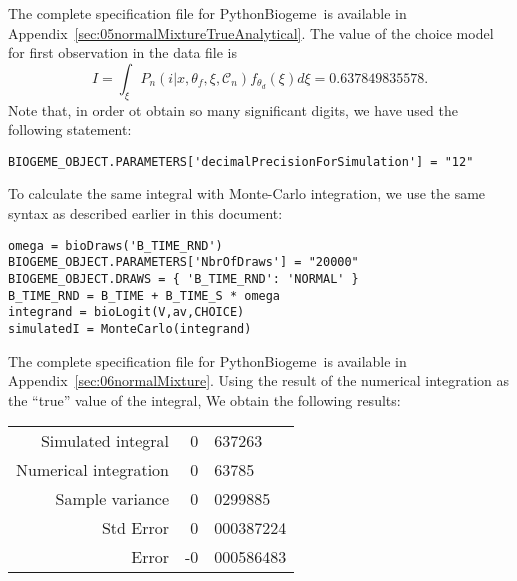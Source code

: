 \documentclass[12pt,a4paper]{article}
\newcommand{\C}{\mathcal{C}}
\newcommand{\PBIOGEME}{PythonBiogeme}
\begin{document}
The complete specification file for \PBIOGEME\ is available in
Appendix~\ref{sec:05normalMixtureTrueAnalytical}. The value of the
choice model for first observation in the data file is 
\begin{equation}
I =  \int_\xi P_n(i|x,\theta_f,\xi,\C_n) f_{\theta_d}(\xi)d\xi = 0.637849835578.
\end{equation}
Note that, in order ot obtain so many significant digits, we have used
the following statement:
\begin{lstlisting}
BIOGEME_OBJECT.PARAMETERS['decimalPrecisionForSimulation'] = "12"
\end{lstlisting}
To calculate the same integral with Monte-Carlo integration, we use
the same syntax as described earlier in this document:
\begin{lstlisting}
omega = bioDraws('B_TIME_RND')
BIOGEME_OBJECT.PARAMETERS['NbrOfDraws'] = "20000"
BIOGEME_OBJECT.DRAWS = { 'B_TIME_RND': 'NORMAL' }
B_TIME_RND = B_TIME + B_TIME_S * omega
integrand = bioLogit(V,av,CHOICE)
simulatedI = MonteCarlo(integrand)
\end{lstlisting}
The complete specification file for \PBIOGEME\ is available in
Appendix~\ref{sec:06normalMixture}. Using the result of the numerical integration as the ``true'' value of
the integral, We obtain the following results:
\begin{center}
\begin{tabular}{rr@{.}l}
Simulated integral & 0&637263 \\
Numerical integration & 0&63785 \\
Sample variance & 0&0299885 \\
Std Error & 0&000387224 \\
Error & -0&000586483 \\
\end{tabular}
\end{center}
\end{document}
